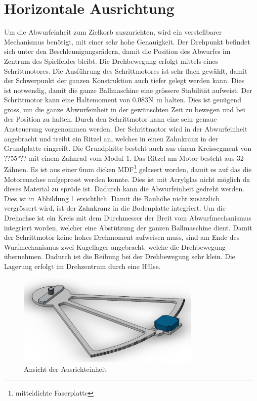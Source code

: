 \section{Horizontale Ausrichtung}
	
    Um die Abwurfeinheit zum Zielkorb auszurichten, wird ein verstellbarer Mechanismus benötigt, 
    mit einer sehr hohe Genauigkeit. Der Drehpunkt befindet sich unter den Beschleunigungsrädern, 
    damit die Position des Abwurfes im Zentrum des Spielfeldes bleibt. Die Drehbewegung erfolgt 
    mittels eines Schrittmotores. Die Ausführung des Schrittmotores ist sehr flach gewählt, damit 
    der Schwerpunkt der ganzen Konstruktion auch tiefer gelegt werden kann. Dies ist notwendig, 
    damit die ganze Ballmaschine eine grössere Stabilität aufweist. Der Schrittmotor kann eine 
    Haltemoment von 0.083\si{\newton\meter} halten. Dies ist genügend gross, um die ganze 
    Abwurfeinheit in der gewünschten Zeit zu bewegen und bei der Position zu halten. Durch den 
    Schrittmotor kann eine sehr genaue Ansteuerung vorgenommen werden. Der Schrittmotor wird in der Abwurfeinheit angebracht und treibt ein Ritzel an, welches in einen Zahnkranz in der Grundplatte 
    eingreift. Die Grundplatte besteht auch aus einem Kreissegment von ??55\si{\degree}?? 
    mit einem Zahnrad vom Modul 1. Das Ritzel am Motor besteht aus 32 Zähnen. Es ist aus einer 
    6\si{\milli\meter} dicken MDF\footnote{mitteldichte Faserplatte} gelasert worden, damit es auf 
    das die Motorenachse aufgepresst werden konnte. Dies ist mit Acrylglas nicht möglich da dieses 
    Material zu spröde ist. Dadurch kann die Abwurfeinheit gedreht werden. Dies ist in Abbildung 
    \ref{abb:Ausrichteinheit} ersichtlich. Damit die Bauhöhe nicht zusätzlich 
    vergrössert wird, ist der Zahnkranz in die Bodenplatte integriert. Um die Drehachse ist ein Kreis 
    mit dem Durchmesser der Breit vom Abwurfmechanismus integriert worden, welcher eine Abstützung 
    der ganzen Ballmaschine dient. 
    Damit der Schrittmotor keine hohes Drehmoment aufweisen muss, sind am Ende des Wurfmechanismus 
    zwei Kugellager angebracht, welche die Drehbewegung übernehmen. Dadurch ist die Reibung bei der 
    Drehbewegung sehr klein. Die Lagerung erfolgt im Drehzentrum durch eine Hülse.
    \begin{figure}[h!]
    	\includegraphics[width=0.8\textwidth,clip,trim=0mm 2mm 0mm 7mm]
    	{Enddokumentation/Bilder/Ausrichteinheit.jpg}
    	\centering
    	\caption{Ansicht der Ausrichteinheit}
    	\label{abb:Ausrichteinheit}
    \end{figure}

